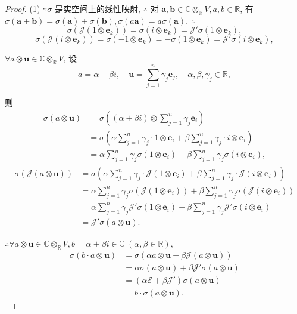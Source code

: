 \documentclass{ctexart}
\begin{document}
\begin{proof}
    (1) $\because\sigma$ 是实空间上的线性映射, $\therefore$ 对 $\boldsymbol{a},\boldsymbol{b}\in\mathbb{C}\otimes_\mathbb{R}V,a,b\in\mathbb{R}$, 有 $\sigma(\boldsymbol{a}+\boldsymbol{b})=\sigma(\boldsymbol{a})+\sigma(\boldsymbol{b}),\sigma(a\boldsymbol{a})=a\sigma(\boldsymbol{a})$. $\therefore$
    \[\sigma(\mathcal{J}(1\otimes\boldsymbol{e}_k))=\sigma(i\otimes\boldsymbol{e}_k)=\mathcal{J}'\sigma(1\otimes\boldsymbol{e}_k),\]
    \[\sigma(\mathcal{J}(i\otimes\boldsymbol{e}_k))=\sigma(-1\otimes\boldsymbol{e}_k)=-\sigma(1\otimes\boldsymbol{e}_k)=\mathcal{J}'\sigma(i\otimes\boldsymbol{e}_k),\]

    $\forall a\otimes\boldsymbol{u}\in\mathbb{C}\otimes_\mathbb{R}V$, 设
    \[a=\alpha+\beta i,\quad\boldsymbol{u}=\sum\limits_{j=1}^n\gamma_j\boldsymbol{e}_j,\quad\alpha,\beta,\gamma_j\in\mathbb{R},\]

    则
    \begin{align*}
        \sigma(a\otimes\boldsymbol{u}) & =\sigma\left((\alpha+\beta i)\otimes\sum\limits_{j=1}^n\gamma_j\boldsymbol{e}_i\right) \\
        & =\sigma\left(\alpha\sum\limits_{j=1}^n\gamma_j\cdot1\otimes\boldsymbol{e}_i+\beta\sum\limits_{j=1}^n\gamma_j\cdot i\otimes\boldsymbol{e}_i\right) \\
        & =\alpha\sum\limits_{j=1}^n\gamma_j\sigma\left(1\otimes\boldsymbol{e}_i\right)+\beta\sum\limits_{j=1}^n\gamma_j\sigma\left(i\otimes\boldsymbol{e}_i\right),
    \end{align*}
    \begin{align*}
        \sigma(\mathcal{J}(a\otimes\boldsymbol{u})) & =\sigma\left(\alpha\sum\limits_{j=1}^n\gamma_j\cdot\mathcal{J}(1\otimes\boldsymbol{e}_i)+\beta\sum\limits_{j=1}^n\gamma_j\cdot\mathcal{J}(i\otimes\boldsymbol{e}_i)\right) \\
        & =\alpha\sum\limits_{j=1}^n\gamma_j\sigma(\mathcal{J}(1\otimes\boldsymbol{e}_i))+\beta\sum\limits_{j=1}^n\gamma_j\sigma(\mathcal{J}(i\otimes\boldsymbol{e}_i)) \\
        & =\alpha\sum\limits_{j=1}^n\gamma_j\mathcal{J}'\sigma(1\otimes\boldsymbol{e}_i)+\beta\sum\limits_{j=1}^n\gamma_j\mathcal{J}'\sigma(i\otimes\boldsymbol{e}_i) \\
        & =\mathcal{J}'\sigma(a\otimes\boldsymbol{u}).
    \end{align*}

    $\therefore\forall a\otimes\boldsymbol{u}\in\mathbb{C}\otimes_\mathbb{R}V,b=\alpha+\beta i\in\mathbb{C}\ (\alpha,\beta\in\mathbb{R})$,
    \begin{align*}
        \sigma(b\cdot a\otimes\boldsymbol{u}) & =\sigma(\alpha a\otimes\boldsymbol{u}+\beta\mathcal{J}(a\otimes\boldsymbol{u})) \\
        & =\alpha\sigma(a\otimes\boldsymbol{u})+\beta\mathcal{J}'\sigma(a\otimes\boldsymbol{u}) \\
        & =(\alpha\mathcal{E}+\beta\mathcal{J}')\sigma(a\otimes\boldsymbol{u}) \\
        & =b\cdot\sigma(a\otimes\boldsymbol{u}).
    \end{align*}


\end{proof}
\end{document}
